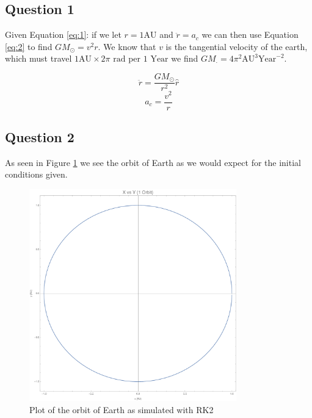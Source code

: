 \documentclass{article}
\begin{document}
\subsection{Question 1}


Given Equation \ref{eq:1}: if we let 
$ r = 1 \text{AU} $ 
and 
$ \ddot{r} = a_c $
we can then use Equation \ref{eq:2} to find 
$ GM_{\odot} = v^2r $.
We know that 
$ v $
is the tangential velocity of the earth, which must travel
$ 1 \text{AU} \times 2\pi \text{ rad} $
per 
$ 1 \text{ Year} $
we find 
$ GM_{\cdot} = 4\pi^2 \text{AU}^3\text{Year}^{-2} $.


\begin{equation}\label{eq:1}
	\ddot{r} = \frac{GM_{\odot}}{r^2}\hat{r}
\end{equation}
\begin{equation}\label{eq:2}
	a_c = \frac{v^2}{r}
\end{equation}



\pagebreak
\subsection{Question 2}

As seen in Figure \ref{fig:qual} we see the orbit of Earth as we would expect for the initial conditions given.

\begin{figure}[!htb]
	\begin{center}
		\includegraphics[width=0.8\textwidth]{qual.pdf}
	\end{center}
	\caption{Plot of the orbit of Earth as simulated with RK2}
\label{fig:qual}
\end{figure}
\FloatBarrier
\end{document}
